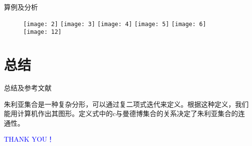 \documentclass[serif]{beamer}
\begin{document}
\begin{frame}{算例及分析}
\begin{figure}
\texttt{[image: 2]}
\texttt{[image: 3]}
\texttt{[image: 4]}
\texttt{[image: 5]}
\texttt{[image: 6]}
\texttt{[image: 12]}
\end{figure}
\end{frame}


\section{总结}


\begin{frame}{总结及参考文献}

朱利亚集合是一种复杂分形，可以通过复二项式迭代来定义。根据这种定义，我们能用计算机作出其图形。定义式中的c与曼德博集合的关系决定了朱利亚集合的连通性。

\begin{center}

\textcolor{blue}{\Huge{THANK YOU！}}

\end{center}

\end{frame}




\end{document}
